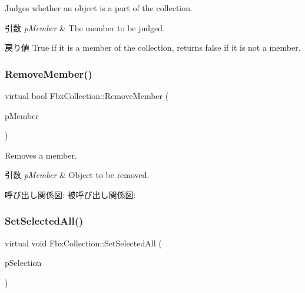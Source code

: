 Judges whether an object is a part of the collection. 
\begin{DoxyParams}{引数}
{\em p\+Member} & The member to be judged. \\
\hline
\end{DoxyParams}
\begin{DoxyReturn}{戻り値}
{\ttfamily True} if it is a member of the collection, returns {\ttfamily false} if it is not a member. 
\end{DoxyReturn}
\mbox{\label{class_fbx_collection_a8a65c60bae5ebfcd19f4aaad99ec10f1}} 
\subsubsection{\texorpdfstring{Remove\+Member()}{RemoveMember()}}
{\footnotesize\ttfamily virtual bool Fbx\+Collection\+::\+Remove\+Member (\begin{DoxyParamCaption}\item[{\hyperlink{class_fbx_object}{Fbx\+Object} $\ast$}]{p\+Member }\end{DoxyParamCaption})\hspace{0.3cm}{\ttfamily [virtual]}}

Removes a member. 
\begin{DoxyParams}{引数}
{\em p\+Member} & Object to be removed. \\
\hline
\end{DoxyParams}
呼び出し関係図\+:
被呼び出し関係図\+:
\mbox{\label{class_fbx_collection_a93caba5f2a0bded8cb00fca4001950e9}} 
\subsubsection{\texorpdfstring{Set\+Selected\+All()}{SetSelectedAll()}}
{\footnotesize\ttfamily virtual void Fbx\+Collection\+::\+Set\+Selected\+All (\begin{DoxyParamCaption}\item[{bool}]{p\+Selection }\end{DoxyParamCaption})\hspace{0.3cm}{\ttfamily [virtual]}}

